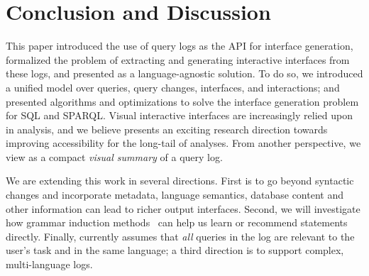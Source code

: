 \section{Conclusion and Discussion}

This paper introduced the use of query logs as the API for interface generation, formalized the problem of extracting and generating interactive interfaces from these logs, and presented \sys as a language-agnostic solution.   To do so, we introduced a unified model over queries, query changes, interfaces, and interactions; and presented algorithms and optimizations to solve the interface generation problem for SQL and SPARQL. Visual interactive interfaces are increasingly relied upon in analysis, and we believe \sys presents an exciting research direction towards improving accessibility for the long-tail of analyses.   From another perspective, we view \sys as a compact {\it visual summary}  of a query log.


We are extending this work in several directions. First is to go beyond syntactic changes and incorporate  metadata, language semantics, database content and other information can lead to richer output interfaces. Second, we will investigate how grammar induction methods~\cite{berwick1987learning} can help us learn or recommend \lang statements directly. Finally, \sys{} currently assumes that \emph{all} queries in the log are relevant to the user's task and in the same language; a third direction is to support complex, multi-language logs.